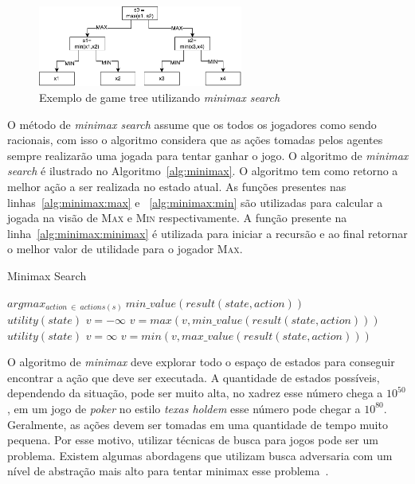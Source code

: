 \begin{figure}[ht]
	\centering
	\includegraphics[width=0.6\textwidth]{fig/gametree.pdf}
	\caption{Exemplo de game tree utilizando \textit{minimax search}}
	\label{fig:gametree}
\end{figure} 

O método de \textit{minimax search} assume que os todos os jogadores como sendo racionais, com isso o algoritmo considera que as ações tomadas pelos agentes sempre realizarão uma jogada para tentar ganhar o jogo.\frm{} 
O algoritmo de \textit{minimax search} é ilustrado no Algoritmo~\ref{alg:minimax}. 
O algoritmo tem como retorno a melhor ação a ser realizada no estado atual. 
As funções presentes nas linhas~\ref{alg:minimax:max} e ~\ref{alg:minimax:min} são utilizadas para calcular a jogada na visão de \textsc{Max} e \textsc{Min} respectivamente.
A função presente na linha~\ref{alg:minimax:minimax} é utilizada para iniciar a recursão e ao final retornar o melhor valor de utilidade para o jogador \textsc{Max}.

\begin{algorithm}
	\caption{Minimax Search}
	\label{alg:minimax}
	\begin{algorithmic}[1]	
		 \label{alg:minimax:minimax}
		\State \Return $arg max_{action~ \in~ actions(s)}~ min\_value(result(state,  action)) $
		\EndFunction \\
		\label{alg:minimax:max}
		\State	\Return $utility(state)$
		\EndIf
		\State $v = -\infty$
		\State $v = max(v, min\_value(result(state,action)))$
		\EndFor	
		\EndFunction \\
		\label{alg:minimax:min}
		\State	\Return $utility(state)$
		\EndIf
		\State $v = \infty$
		\State $v = min(v, max\_value(result(state,action)))$
		\EndFor	
		\EndFunction
	\end{algorithmic}
\end{algorithm}


O algoritmo de \textit{minimax} deve explorar todo o espaço de estados para conseguir encontrar a ação que deve ser executada. 
A quantidade de estados possíveis, dependendo da situação, pode ser muito alta, no xadrez esse número chega a $10^{50}$, em um jogo de \textit{poker} no estilo \textit{texas holdem} esse número pode chegar a $10^{80}$. 
Geralmente, as ações devem ser tomadas em uma quantidade de tempo muito pequena. 
Por esse motivo, utilizar técnicas de busca para jogos pode ser um problema. 
Existem algumas abordagens que utilizam busca adversaria com um nível de abstração mais alto para tentar minimax esse problema~\cite{ontanon2013survey}. 
